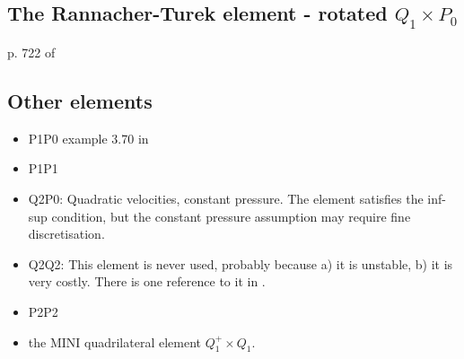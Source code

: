 \subsection{The Rannacher-Turek element - rotated $Q_1\times P_0$}

p. 722 of \cite{john16}

\subsection{Other elements}

\begin{itemize}
\item P1P0 example 3.70 in \cite{john16}
\item P1P1
\item Q2P0: 
Quadratic velocities, constant pressure. The element satisfies the inf-sup condition, but the constant pressure assumption may require fine discretisation.

\item Q2Q2: This element is never used, probably because a) it is unstable, b) it is very costly. 
There is one reference to it in \cite{hufb86}.
\item P2P2
\item the MINI quadrilateral element $Q_1^+\times Q_1$.  
\end{itemize}

